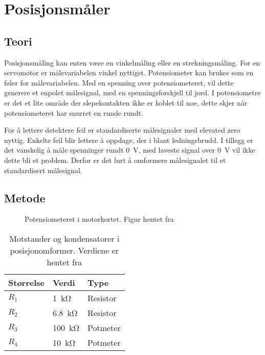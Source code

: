 \section{Posisjonsmåler}
\label{sec:pos_måler}

\subsection{Teori}




Posisjonsmåling kan enten være en vinkelmåling eller en strekningsmåling. For en servomotor er målevariabelen vinkel nyttigst. Potensiometer kan brukes som en føler for målevariabelen. Med en spenning over potensiometeret, vil dette generere et enpolet målesignal, med en spenningsforskjell til jord. I potensiometre er det et lite område der slepekontakten ikke er koblet til noe, dette skjer når potensiometeret har snurret en runde rundt.


For å lettere detektere feil er standardiserte målesignaler med elevated zero nyttig. Enkelte feil blir lettere å oppdage, der i blant ledningsbrudd. I tillegg er det vanskelig å måle spenninger rundt \SI{0}{\volt}, med laveste signal over \SI{0}{\volt} vil ikke dette bli et problem. Derfor er det lurt å omformere målesignalet til et standardisert målesignal.






\subsection{Metode}

\begin{figure}[h]
    \centering
    
    \caption{Potensiometeret i motorkortet. Figur hentet fra \cite{AnalogMotorlabbOppgaver}}
    \label{fig:posisjon_maler_potmeter}
\end{figure}

\begin{table}[h]
    \centering
    \caption{Motstander og kondensatorer i posisjonomformer. Verdiene er hentet fra \cite{AnalogMotorlabbOppgaver}}
    \begin{tabular}{lll}
        \toprule
        Størrelse & Verdi & Type \\
		\midrule
        $R_1$ & \SI{1}{\kilo\ohm} & Resistor\\
        $R_2$ & \SI{6.8}{\kilo\ohm} & Resistor \\
        $R_3$ & \SI{100}{\kilo\ohm} & Potmeter \\
        $R_4$ & \SI{10}{\kilo\ohm} & Potmeter \\
        \bottomrule
    \end{tabular}
    \label{tab:Komponenter_i_posisjonsmaler}
\end{table}

